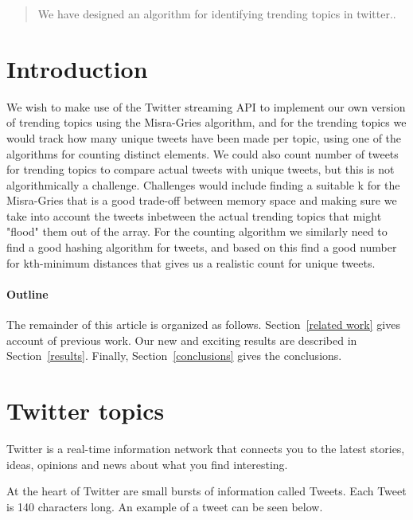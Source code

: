 \documentclass[12pt]{article}
\begin{document}
\maketitle

\begin{abstract}
We have designed an algorithm for identifying trending topics in twitter..
\end{abstract}

\section{Introduction}
We wish to make use of the Twitter streaming API to implement our own version of trending topics using the Misra-Gries algorithm, and for the trending topics we would track how many unique tweets have been made per topic, using one of the algorithms for counting distinct elements. We could also count number of tweets for trending topics to compare actual tweets with unique tweets, but this is not algorithmically a challenge.
\newline\newline
Challenges would include finding a suitable k for the Misra-Gries that is a good trade-off between memory space and making sure we take into account the tweets inbetween the actual trending topics that might "flood" them out of the array.
\newline\newline
For the counting algorithm we similarly need to find a good hashing algorithm for tweets, and based on this find a good number for kth-minimum distances that gives us a realistic count for unique tweets.

\paragraph{Outline}
The remainder of this article is organized as follows.
Section~\ref{related work} gives account of previous work.
Our new and exciting results are described in Section~\ref{results}.
Finally, Section~\ref{conclusions} gives the conclusions.


\section{Twitter topics}
Twitter is a real-time information network that connects you to the latest stories, ideas, opinions and news about what you find interesting.

At the heart of Twitter are small bursts of information called Tweets. Each Tweet is 140 characters long. An example of a tweet can be seen below.
\newline
\end{document}
